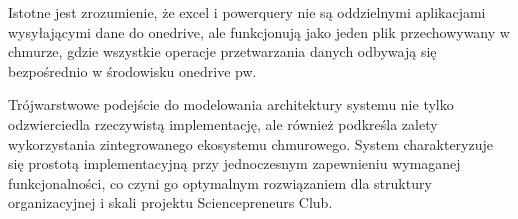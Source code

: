 Istotne jest zrozumienie, że \gls{excel} i \gls{powerquery} nie są oddzielnymi aplikacjami wysyłającymi dane do \gls{onedrive}, ale funkcjonują jako jeden plik przechowywany w chmurze, gdzie wszystkie operacje przetwarzania danych odbywają się bezpośrednio w środowisku \gls{onedrive} \gls{pw}.


Trójwarstwowe podejście do modelowania architektury systemu nie tylko odzwierciedla rzeczywistą implementację, ale również podkreśla zalety wykorzystania zintegrowanego ekosystemu chmurowego. System charakteryzuje się prostotą implementacyjną przy jednoczesnym zapewnieniu wymaganej funkcjonalności, co czyni go optymalnym rozwiązaniem dla struktury organizacyjnej i skali projektu Sciencepreneurs Club.



